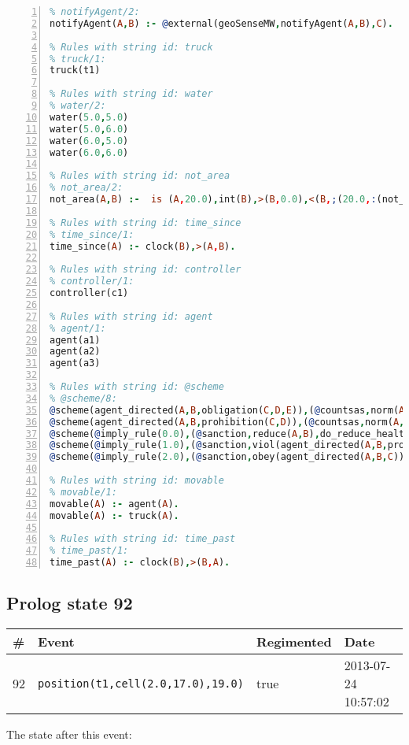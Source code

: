 \documentclass[11pt]{article}\usepackage[utf8]{inputenc}\usepackage{geometry}
\begin{document}
\begin{lstlisting}[language=Prolog, numbers=left]
% Rules with string id: notifyAgent
% notifyAgent/2:
notifyAgent(A,B) :- @external(geoSenseMW,notifyAgent(A,B),C).

% Rules with string id: truck
% truck/1:
truck(t1)

% Rules with string id: water
% water/2:
water(5.0,5.0)
water(5.0,6.0)
water(6.0,5.0)
water(6.0,6.0)

% Rules with string id: not_area
% not_area/2:
not_area(A,B) :-  is (A,20.0),int(B),>(B,0.0),<(B,;(20.0,:(not_area(A,B), is (-(B),20.0)))),int(A),>(A,0.0),<(A,;(20.0,:(area(A,B),-(int(A))))),int(B),>(A,0.0),>(B,0.0),<(A,21.0),<(B,21.0).

% Rules with string id: time_since
% time_since/1:
time_since(A) :- clock(B),>(A,B).

% Rules with string id: controller
% controller/1:
controller(c1)

% Rules with string id: agent
% agent/1:
agent(a1)
agent(a2)
agent(a3)

% Rules with string id: @scheme
% @scheme/8:
@scheme(agent_directed(A,B,obligation(C,D,E)),(@countsas,norm(A,B,F,obligation(C,D,E)),F),false,(listTrue(C)),(time_past(D)),false,[plus(viol(agent_directed(A,B,obligation(C,D,E))))|[]],[plus(obey(agent_directed(A,B,obligation(C,D,E))))|[]])
@scheme(agent_directed(A,B,prohibition(C,D)),(@countsas,norm(A,B,E,prohibition(C,D)),E),(listTrue(C)),false,(false),false,[plus(viol(agent_directed(A,B,prohibition(C,D))))|[]],[plus(obey(agent_directed(A,B,prohibition(C,D))))|[]])
@scheme(@imply_rule(0.0),(@sanction,reduce(A,B),do_reduce_health(A,B),notifyAgent(A,changed(status))),true,false,false,false,[min(reduce(A,B))|[]],[])
@scheme(@imply_rule(1.0),(@sanction,viol(agent_directed(A,B,prohibition(C,D))),do_sanction(D)),true,false,false,false,[min(viol(agent_directed(A,B,prohibition(C,D))))|[]],[])
@scheme(@imply_rule(2.0),(@sanction,obey(agent_directed(A,B,C))),true,false,false,false,[min(obey(agent_directed(A,B,C)))|[]],[])

% Rules with string id: movable
% movable/1:
movable(A) :- agent(A).
movable(A) :- truck(A).

% Rules with string id: time_past
% time_past/1:
time_past(A) :- clock(B),>(B,A).

\end{lstlisting}
\clearpage 
\subsection{Prolog state 92}
\begin{table}[ht]
\centering 
\begin{tabular}{l l l l} 
\textbf{\#} & \textbf{Event} & \textbf{Regimented} & \textbf{Date} \\ [0.5ex] 
\hline
92&\texttt{position(t1,cell(2.0,17.0),19.0)}&true&2013-07-24 10:57:02\\ [1ex] \hline\end{tabular}
\end{table}
The state after this event:
\end{document}
